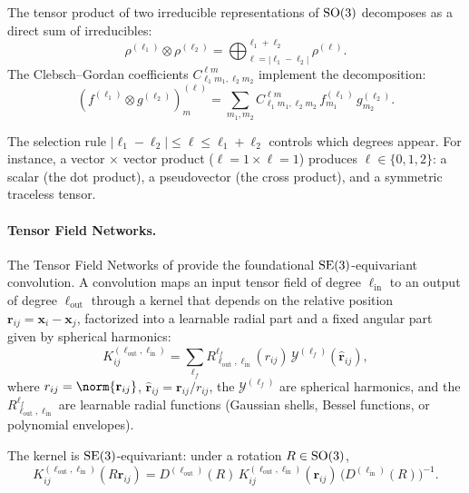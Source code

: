 \begin{theorem}
\label{thm:groups:clebsch-gordan}
The tensor product of two irreducible representations of $\operatorname{SO}(3)$ decomposes as a
direct sum of irreducibles:
\begin{equation}
  \rho^{(\ell_1)} \otimes \rho^{(\ell_2)}
  = \bigoplus_{\ell = |\ell_1 - \ell_2|}^{\ell_1 + \ell_2} \rho^{(\ell)}.
\end{equation}
The Clebsch--Gordan coefficients $C^{\ell m}_{\ell_1 m_1, \ell_2 m_2}$ implement
the decomposition:
\begin{equation}
  (f^{(\ell_1)} \otimes g^{(\ell_2)})^{(\ell)}_m
  = \sum_{m_1, m_2} C^{\ell m}_{\ell_1 m_1, \ell_2 m_2}\,
    f^{(\ell_1)}_{m_1}\, g^{(\ell_2)}_{m_2}.
\end{equation}
\end{theorem}

The selection rule $|\ell_1 - \ell_2| \leq \ell \leq \ell_1 + \ell_2$ controls
which degrees appear. For instance, a vector $\times$ vector product ($\ell = 1
\times \ell = 1$) produces $\ell \in \{0, 1, 2\}$: a scalar (the dot product), a
pseudovector (the cross product), and a symmetric traceless tensor.

\paragraph{Tensor Field Networks.}
The Tensor Field Networks of \citet{thomas2018tensorfieldnetworks} provide the
foundational $\operatorname{SE}(3)$-equivariant convolution. A convolution maps an input
tensor field of degree $\ell_{\text{in}}$ to an output of degree
$\ell_{\text{out}}$ through a kernel that depends on the relative position
$\mathbf{r}_{ij} = \mathbf{x}_i - \mathbf{x}_j$, factorized into a learnable
radial part and a fixed angular part given by spherical harmonics:
\begin{equation}
  K^{(\ell_{\text{out}}, \ell_{\text{in}})}_{ij}
  = \sum_{\ell_f} R^{\ell_f}_{\ell_{\text{out}}, \ell_{\text{in}}}(r_{ij})\,
    \mathcal{Y}^{(\ell_f)}(\hat{\mathbf{r}}_{ij}),
  \label{eq:groups:tfn-kernel}
\end{equation}
where $r_{ij} = \norm{\mathbf{r}_{ij}}$, $\hat{\mathbf{r}}_{ij} =
\mathbf{r}_{ij}/r_{ij}$, the $\mathcal{Y}^{(\ell_f)}$ are spherical harmonics,
and the $R^{\ell_f}_{\ell_{\text{out}}, \ell_{\text{in}}}$ are learnable radial
functions (Gaussian shells, Bessel functions, or polynomial envelopes).

\begin{proposition}
\label{prop:groups:tfn-kernel-equivariance}
The kernel  is $\operatorname{SE}(3)$-equivariant: under a rotation
$R \in \operatorname{SO}(3)$,
\begin{equation}
  K^{(\ell_{\text{out}}, \ell_{\text{in}})}_{ij}(R\mathbf{r}_{ij})
  = D^{(\ell_{\text{out}})}(R)\,
    K^{(\ell_{\text{out}}, \ell_{\text{in}})}_{ij}(\mathbf{r}_{ij})\,
    \big(D^{(\ell_{\text{in}})}(R)\big)^{-1}.
\end{equation}
\end{proposition}

